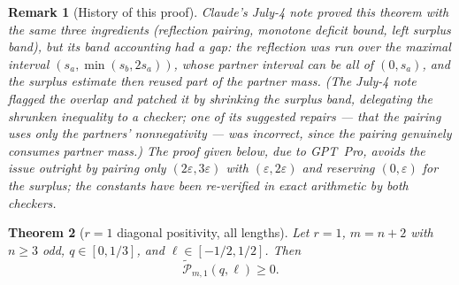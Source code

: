 \documentclass[11pt]{article}
\newtheorem{theorem}{Theorem}[section]
\newtheorem{remark}[theorem]{Remark}
\newcommand{\wtP}{\widetilde{\mathcal P}}
\begin{document}
\begin{remark}[History of this proof]\label{rmk:r1-history}
Claude's July-4 note proved this theorem with the same three ingredients
(reflection pairing, monotone deficit bound, left surplus band), but its band
accounting had a gap: the reflection was run over the maximal interval
$(s_a,\min(s_b,2s_a))$, whose partner interval can be all of $(0,s_a)$, and
the surplus estimate then reused part of the partner mass.  (The July-4 note
flagged the overlap and patched it by shrinking the surplus band, delegating
the shrunken inequality to a checker; one of its suggested repairs --- that
the pairing uses only the partners' nonnegativity --- was incorrect, since the
pairing genuinely consumes partner mass.)  The proof given below, due to
GPT~Pro, avoids the issue outright by pairing only
$(2\varepsilon,3\varepsilon)$ with $(\varepsilon,2\varepsilon)$ and reserving
$(0,\varepsilon)$ for the surplus; the constants have been re-verified in
exact arithmetic by both checkers.
\end{remark}


\begin{theorem}[$r=1$ diagonal positivity, all lengths]\label{thm:r1}
Let $r=1$, $m=n+2$ with $n\ge3$ odd, $q\in[0,1/3]$, and $\ell\in[-1/2,1/2]$.  Then
\[
        \wtP_{m,1}(q,\ell)\ge0.
\]
\end{theorem}
\end{document}

